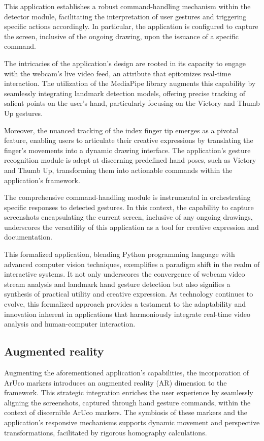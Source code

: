 \documentclass[journal]{IEEEtran}
\begin{document}
This application establishes a robust command-handling mechanism within the detector module, facilitating the interpretation of user
 gestures and triggering specific actions accordingly. In particular, the application is configured to capture the screen, inclusive 
 of the ongoing drawing, upon the issuance of a specific command.

The intricacies of the application's design are rooted in its capacity to engage with the webcam's live video feed, an attribute that 
epitomizes real-time interaction. The utilization of the MediaPipe library augments this capability by seamlessly integrating landmark 
detection models, offering precise tracking of salient points on the user's hand, particularly focusing on the Victory and Thumb Up gestures.

Moreover, the nuanced tracking of the index finger tip emerges as a pivotal feature, enabling users to articulate their creative 
expressions by translating the finger's movements into a dynamic drawing interface. The application’s gesture recognition module is 
adept at discerning predefined hand poses, such as Victory and Thumb Up, transforming them into actionable commands within the 
application's framework.

The comprehensive command-handling module is instrumental in orchestrating specific responses to detected gestures. In this context, 
the capability to capture screenshots encapsulating the current screen, inclusive of any ongoing drawings, underscores the versatility
 of this application as a tool for creative expression and documentation.

This formalized application, blending Python programming language with advanced computer vision techniques, exemplifies a paradigm 
shift in the realm of interactive systems. It not only underscores the convergence of webcam video stream analysis and landmark hand 
gesture detection but also signifies a synthesis of practical utility and creative expression. As technology continues to evolve, 
this formalized approach provides a testament to the adaptability and innovation inherent in applications that harmoniously integrate 
real-time video analysis and human-computer interaction.

\subsection*{Augmented reality}
Augmenting the aforementioned application's capabilities, the incorporation of ArUco markers introduces an augmented reality (AR) 
dimension to the framework. This strategic integration enriches the user experience by seamlessly aligning the screenshots, captured 
through hand gesture commands, within the context of discernible ArUco markers. The symbiosis of these markers and the application's 
responsive mechanisms supports dynamic movement and perspective transformations, facilitated by rigorous homography calculations.
\end{document}

